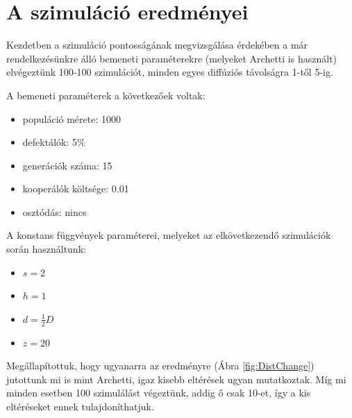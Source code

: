 
\section{A szimuláció eredményei}

Kezdetben a szimuláció pontosságának megvizsgálása érdekében a már rendelkezésünkre álló bemeneti paraméterekre (melyeket Archetti is használt\cite{archetti2013evolutionary}) elvégeztünk 100-100 szimulációt, minden egyes diffúziós távolságra 1-től 5-ig.

\begin{multicols}{2}
	A bemeneti paraméterek a következőek voltak:
	\begin{itemize}[noitemsep]
		\item populáció mérete: 1000
		\item defektálók: 5\%
		\item generációk száma: 15
		\item kooperálók költsége: 0.01
		\item osztódás: nincs
	\end{itemize}
	A konstans függvények paraméterei, melyeket az elkövetkezendő szimulációk során használtunk:
	\begin{itemize}[noitemsep]
		\item $s = 2$
		\item $h = 1$
		\item $d = \frac{1}{2}D$
		\item $z = 20$
	\end{itemize}	
\end{multicols}

Megállapítottuk, hogy ugyanarra az eredményre (Ábra \ref{fig:DistChange}) jutottunk mi is mint Archetti\cite{archetti2013evolutionary}, igaz kisebb eltérések ugyan mutatkoztak. Míg mi minden esetben 100 szimulálást végeztünk, addig ő csak 10-et, így a kis eltéréseket ennek tulajdoníthatjuk.


